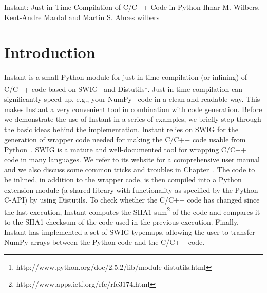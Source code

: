 

              {Instant: Just-in-Time Compilation of C/C++ Code in Python}
              {Ilmar M. Wilbers, Kent-Andre Mardal and Martin S. Aln{\ae}s}
              {wilbers}

%



\section{Introduction}

Instant is a small Python module for just-in-time compilation (or inlining) of
C/C++ code based on SWIG~\cite{www:SWIG} and
Distutils\footnote{http://www.python.org/doc/2.5.2/lib/module-distutils.html}. 
Just-in-time compilation can significantly speed up, e.g., your NumPy~\cite{www:NumPy} code in a clean and
readable way. This makes Instant a very convenient tool in combination with code
generation. Before we demonstrate the use of Instant in a series of examples,
we briefly step through the basic ideas behind the implementation.
Instant relies on SWIG for the generation of wrapper code needed for making the
C/C++ code usable from Python~\cite{www:Python}. SWIG is a mature and well-documented tool
for wrapping C/C++ code in many languages. We refer to its website for a comprehensive 
user manual and we also discuss some common tricks and troubles in Chapter~\cite{chap:mardal-2}. 
The code to be inlined, in addition to the
wrapper code, is then compiled into a Python extension module (a shared library
with functionality as specified by the Python C-API) by using
Distutils. To check whether the C/C++ code has changed since the last
execution, Instant computes the SHA1
sum\footnote{http://www.apps.ietf.org/rfc/rfc3174.html} of the code and compares it to
the SHA1 checksum of the code used in the previous execution. Finally, Instant has
implemented a set of SWIG typemaps, allowing the user to
transfer NumPy arrays between the Python code and the C/C++ code.

